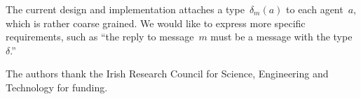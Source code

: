 \documentclass[preprint]{sigplanconf} %
\theoremstyle{remark}
\begin{document}
The current design and implementation attaches a type~$\delta_m(a)$ to each
agent~$a$, which is rather coarse grained. We would like to express more
specific requirements, such as ``the reply to message~$m$ must be a message
with the type~$\delta$.''

%
%
%
%
\acks

The authors thank the Irish Research Council for Science, Engineering and
Technology for funding.




\end{document}
